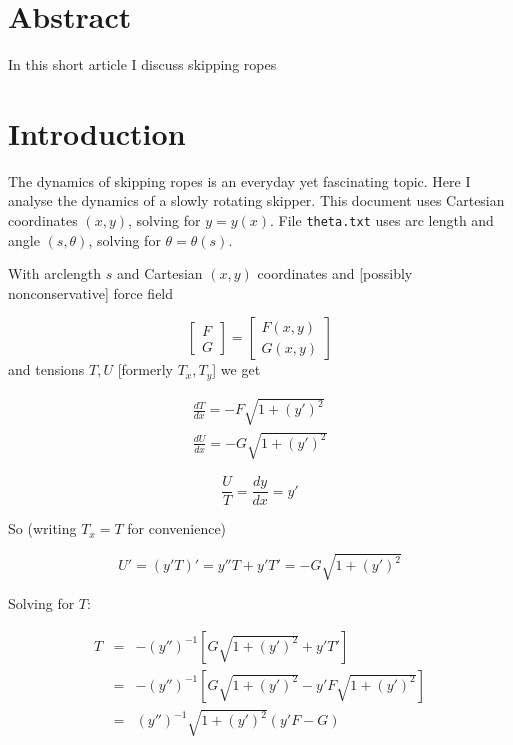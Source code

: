 \documentclass{article}
\begin{document}
\newcommand{\jj}{\sqrt{1+\left(y'\right)^2}}
\section*{Abstract}
In this short article I discuss skipping ropes



\section{Introduction}

The dynamics of skipping ropes is an everyday yet fascinating topic.
Here I analyse the dynamics of a slowly rotating skipper.  This
document uses Cartesian coordinates $(x,y)$, solving for $y=y(x)$.
File {\tt theta.txt} uses arc length and angle $(s,\theta)$, solving
for $\theta=\theta(s)$.


\citep{mohazzabi1999}


With arclength $s$ and Cartesian $(x,y)$ coordinates and [possibly
  nonconservative] force field

\begin{equation}
  \begin{bmatrix}F\\G\end{bmatrix}
    =
    \begin{bmatrix}F(x,y)\\G(x,y)\end{bmatrix}
\end{equation}
and tensions $T,U$ [formerly $T_x,T_y$] we get

\begin{eqnarray}
  \frac{dT}{dx}=-F\jj\label{Tx}\\
  \frac{dU}{dx}=-G\jj\label{Ty}
  \end{eqnarray}

\begin{equation}
  \frac{U}{T}=\frac{dy}{dx}=y'
\end{equation}

So (writing $T_x=T$ for convenience)

\begin{equation}
U'=(y'T)'=y''T+y'T'=-G\jj
\end{equation}

Solving for $T$:

\begin{eqnarray}
  T &=& -(y'')^{-1}\left[G\jj + y'T'\right]\nonumber\\
  &=& -(y'')^{-1}\left[G\jj -y'F\jj\right]\nonumber\\
    &=& (y'')^{-1}\jj(y'F-G)\label{eqforT}
\end{eqnarray}
\end{document}
